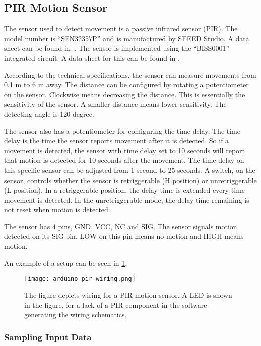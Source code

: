\subsection{PIR Motion Sensor}

The sensor used to detect movement is a passive infrared sensor (PIR). The model
number is \enquote{SEN32357P} and is manufactured by SEEED Studio. A data sheet
can be found in:
\cite{datasheet_pir1}. The
sensor is implemented using the \enquote{BISS0001} integrated circuit. A data sheet for this can
be found in \cite{datasheet_pir2}.

According to the technical specifications, the sensor can measure movements from 0.1 m to 6 m away. The distance can be configured by rotating a potentiometer on the sensor. Clockwise means decreasing the distance. This is essentially the sensitivity of the sensor. A smaller distance means lower sensitivity. The detecting angle is 120 degree.

The sensor also has a potentiometer for configuring the time delay. The time
delay is the time the sensor reports movement after it is detected. So
if a movement is detected, the sensor with time delay set to 10 seconds will report that motion is detected for 10 seconds after the movement.
The time delay on this specific sensor can be adjusted from 1 second to 25 seconds. A switch, on the sensor, controls whether the sensor is retriggerable (H position) or unretriggerable (L position). In a retriggerable position, the delay time is extended every time movement is detected. In the unretriggerable mode, the delay time remaining is not reset when motion is detected.

The sensor has 4 pins, GND, VCC, NC and SIG. The sensor signals motion detected on its SIG pin. LOW on this pin means no motion and HIGH means motion.

An example of a setup can be seen in \cref{fig:arduino_pir_wiring}.

\begin{figure}[htbp]
  \centering
  \texttt{[image: arduino-pir-wiring.png]}
  \caption{The figure depicts wiring for a PIR motion sensor. A LED is shown in
    the figure, for a lack of a PIR component in the software generating the
    wiring schematics.}
  \label{fig:arduino_pir_wiring}
\end{figure}

\subsubsection{Sampling Input Data}

